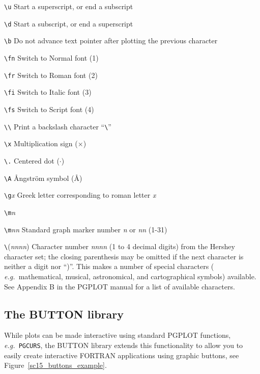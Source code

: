 \documentclass[twoside,11pt]{article}
\newcommand{\htmladdnormallink}[2]{#1}
\newcommand{\xlabel}[1]{}
\begin{document}
\begin{description}

\item \verb*|\u| Start a superscript, or end a subscript
\item \verb*|\d| Start a subscript, or end a superscript 
\item \verb*|\b| Do not advance text pointer after plotting the previous character
\item \verb*|\fn| Switch to  Normal font (1)
\item \verb*|\fr| Switch to Roman font (2)
\item \verb*|\fi| Switch to Italic font (3)
\item \verb*|\fs| Switch to Script font (4)
\item \verb*|\\| Print a backslash character ``\verb*|\|''
\item \verb*|\x|  Multiplication sign ($\times$)
\item \verb*|\.| Centered dot ($\cdot$)
\item \verb*|\A| {\rm \AA}ngstr\"{o}m symbol ({\rm \AA})
\item \verb*|\g|{\em x} Greek letter corresponding to roman letter {\em x}
\item \verb*|\m|{\em n}
\item \verb*|\m|{\em nn} Standard graph marker number {\em n} or {\em nn} (1-31)

\item \verb*|\|({\em nnnn}) Character number {\em nnnn} (1 to 4
      decimal digits) from the Hershey character set; the closing
      parenthesis may be omitted if the next character is neither a
      digit nor ``)''. This makes a number of special characters ({\em
      e.g.\ }mathematical, musical, astronomical, and cartographical
      symbols) available. See \htmladdnormallink{Appendix
      B}{http://astro.caltech.edu/~tjp/pgplot/hershey.html} in the
      PGPLOT manual for a list of available characters.

\end{description}

\subsection{\xlabel{sc15_pgbut}The BUTTON library\label{sc15_pgbut}}

While plots can be made interactive using standard PGPLOT functions,
{\em e.g.\ }{\tt PGCURS}, the
\htmladdnormallink{BUTTON}{http://www.ucm.es/info/Astrof/button/button.html}
library extends this functionality to allow you to easily create
interactive FORTRAN applications using graphic buttons, see
Figure~\ref{sc15_buttons_example}.
\end{document}
